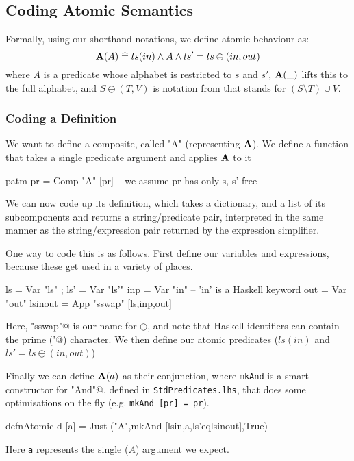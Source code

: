 \subsection{Coding Atomic Semantics}

Formally, using our shorthand notations, we define atomic behaviour as:
\[
    \mathbf{A}(A) \mathrel{\widehat=} ls(in) \land A \land ls'=ls\ominus(in,out)
\]
where $A$ is a predicate whose alphabet is restricted to $s$ and $s'$,
$\mathbf{A}(\_)$ lifts this to the full alphabet,
and $S\ominus(T,V)$ is notation from \cite{DBLP:conf/icfem/WoodcockH02}
that stands for $(S\setminus T)\cup V$.


\subsubsection{Coding a Definition}

We want to define a composite, called "A" (representing $\mathbf{A}$).
We  define a function that takes a single predicate argument
and applies $\mathbf{A}$ to it
\begin{code}
patm pr = Comp "A" [pr] -- we assume pr has only s, s' free
\end{code}
We can now code up its definition,
which takes a dictionary, and a list of its subcomponents
and returns a string/predicate pair,
interpreted in the same manner as the string/expression pair
returned by the expression simplifier.

One way to code this is as follows.
First define our variables and expressions,
because these get used in a variety of places.
\begin{code}
ls = Var "ls" ; ls' = Var "ls'"
inp = Var "in" -- 'in' is a Haskell keyword
out = Var "out"
lsinout = App "sswap" [ls,inp,out]
\end{code}
Here, \verb@"sswap"@ is our name for $\ominus$,
and note that Haskell identifiers can contain
the prime (\verb@'@) character.
We then define our atomic predicates ($ls(in)$ and $ls'=ls\ominus(in,out)$)
Finally we can define $\mathbf{A}(a)$ as their conjunction,
where \texttt{mkAnd} is a smart constructor for \verb@Comp "And"@,
defined in \texttt{StdPredicates.lhs},
that does some optimisations on the fly (e.g. \verb$mkAnd [pr] = pr$).
\begin{code}
defnAtomic d [a] = Just ("A",mkAnd [lsin,a,ls'eqlsinout],True)
\end{code}
Here \texttt{a} represents the single ($A$) argument we expect.

